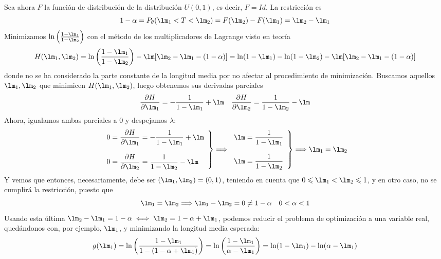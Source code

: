 \documentclass[12pt]{article}
\begin{document}
\begin{ejercicio}
\begin{enumerate}[label=\alph*)]
            Sea ahora $F$ la función de distribución de la distribución $U(0,1)$, es decir, $F = Id$. La restricción es 
            $$1 - \alpha = P_\theta(\lm_1 < T < \lm_2) = F(\lm_2) - F(\lm_1) = \lm_2 - \lm_1$$
            Minimizamos $\ln \left( \frac{1-\lm_1}{1-\lm_2} \right)$ con el método de los multiplicadores de Lagrange visto en teoría
            $$H(\lm_1, \lm_2) = \ln \left( \dfrac{1-\lm_1}{1-\lm_2} \right) - \lm[\lm_2 - \lm_1 - (1-\alpha)] = \ln(1-\lm_1) - \ln(1-\lm_2) - \lm[\lm_2 - \lm_1 - (1-\alpha)]$$
            donde no se ha considerado la parte constante de la longitud media por no afectar al procedimiento de minimización. 
            Buscamos aquellos $\lm_1, \lm_2$ que minimicen $H(\lm_1, \lm_2)$, luego obtenemos sus derivadas parciales
            $$\dfrac{\partial H}{\partial \lm_1} = -\dfrac{1}{1-\lm_1} + \lm \quad 
            \dfrac{\partial H}{\partial \lm_2} = \dfrac{1}{1-\lm_2} - \lm$$
            Ahora, igualamos ambas parciales a $0$ y despejamos $\lambda$:
            \begin{equation*}
                \left.\begin{array}{l}
                    0 = \dfrac{\partial H}{\partial \lm_1} = -\dfrac{1}{1-\lm_1} + \lm \\\\
                    0 = \dfrac{\partial H}{\partial \lm_2} = \dfrac{1}{1-\lm_2} - \lm
                \end{array}\right\} \Longrightarrow \left.\begin{array}{l}
                    \lm = \dfrac{1}{1-\lm_1} \\\\
                    \lm = \dfrac{1}{1-\lm_2}
                \end{array}\right\} \Longrightarrow \lm_1 = \lm_2
            \end{equation*}
            Y vemos que entonces, necesariamente, debe ser $(\lm_1, \lm_2) = (0,1)$, teniendo en cuenta que $0 \leqslant \lm_1 < \lm_2 \leqslant 1$, y en otro caso, no se cumplirá la restricción, puesto que 
            $$\lm_1 = \lm_2 \Longrightarrow \lm_1 - \lm_2 = 0 \neq 1 - \alpha \quad 0 < \alpha < 1$$
            Usando esta última $\lm_2 - \lm_1 = 1 - \alpha \iff \lm_2 = 1 - \alpha + \lm_1$, podemos reducir el problema de optimización a una variable real, quedándonos con, por ejemplo, $\lm_1$, y minimizando la longitud media esperada:
            $$g(\lm_1) = \ln \left( \frac{1-\lm_1}{1-(1 - \alpha + \lm_1)} \right) = \ln \left( \frac{1-\lm_1}{\alpha - \lm_1} \right) = \ln(1-\lm_1) - \ln(\alpha-\lm_1)$$ 

\end{enumerate}
\end{ejercicio}
\end{document}
